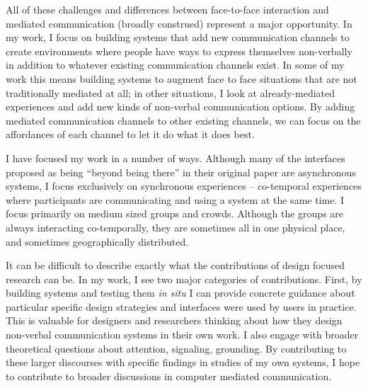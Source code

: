 \documentclass{tufte-handout}
\begin{document}

All of these challenges and differences between face-to-face interaction and  mediated communication (broadly construed) represent a major opportunity. In my work, I focus on building systems that add new communication channels to create environments where people have ways to express themselves non-verbally in addition to whatever existing communication channels exist. In some of my work this means building systems to augment face to face situations that are not traditionally mediated at all; in other situations, I look at already-mediated experiences and add new kinds of non-verbal communication options. By adding mediated communication channels to other existing channels, we can focus on the affordances of each channel to let it do what it does best.


I have focused my work in a number of ways. Although many of the interfaces proposed as being ``beyond being there'' in their original paper are asynchronous systems, I focus exclusively on synchronous experiences -- co-temporal experiences where participants are communicating and using a system at the same time. I focus primarily on medium sized groups and crowds. Although the groups are always interacting co-temporally, they are sometimes all in one physical place, and sometimes geographically distributed. 

It can be difficult to describe exactly what the contributions of design focused research can be. In my work, I see two major categories of contributions. First, by building systems and testing them \emph{in situ} I can provide concrete guidance about particular specific design strategies and interfaces were used by users in practice. This is valuable for designers and researchers thinking about how they design non-verbal communication systems in their own work. I also engage with broader theoretical questions about attention, signaling, grounding. By contributing to these larger discourses with specific findings in studies of my own systems, I hope to contribute to broader discussions in computer mediated communication. 
\end{document}
